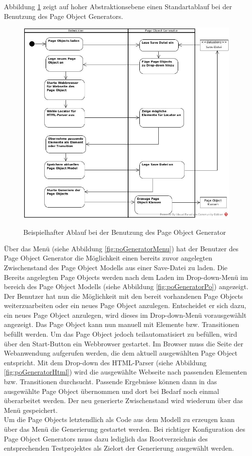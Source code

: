 Abbildung \ref{fig:sequenz} zeigt auf hoher Abstraktionsebene einen Standartablauf bei der Benutzung des Page Object Generators.



\begin{figure}[htb]
  \centering  
  \includegraphics[scale=0.45]{img/Activitydiagram.jpg}\\
  \caption{Beispielhafter Ablauf bei der Benutzung des Page Object Generator}
  \label{fig:sequenz}
\end{figure}

Über das Menü (siehe Abbildung \ref{fig:poGeneratorMenu}) hat der Benutzer des Page Object Generator die Möglichkeit einen bereits zuvor angelegten Zwischenstand des Page Object Modells aus einer Save-Datei zu laden. Die Bereits angelegten Page Objects werden nach dem Laden im Drop-down-Menü im bereich des Page Object Modells (siehe Abbildung \ref{fig:poGeneratorPo}) angezeigt. Der Benutzer hat nun die Möglichkeit mit den bereit vorhandenen Page Objects weiterzuarbeiten oder ein neues Page Object anzulegen. Entscheidet er sich dazu, ein neues Page Object anzulegen, wird dieses im Drop-down-Menü vorausgewählt angezeigt. Das Page Object kann nun manuell mit Elemente bzw. Transitionen befüllt werden. Um das Page Object jedoch teilautomatisiert zu befüllen, wird über den Start-Button ein Webbrowser gestartet. Im Browser muss die Seite der Webanwendung aufgerufen werden, die dem aktuell ausgewählten Page Object entspricht. Mit dem Drop-down des HTML-Parser (siehe Abbildung \ref{fig:poGeneratorHtml}) wird die ausgewählte Webseite nach passenden Elementen bzw. Transitionen durchsucht.
Passende Ergebnisse können dann in das ausgewählte Page Object übernommen und dort bei Bedarf noch einmal überarbeitet werden.
Der neu generierte Zwischenstand wird wiederum über das Menü gespeichert.\\
Um die Page Objects letztendlich als Code aus dem Modell zu erzeugen kann über das Menü die Generierung gestartet werden. Bei richtiger Konfiguration des Page Object Generators muss dazu lediglich das Rootverzeichnis des entsprechenden Testprojektes als Zielort der Generierung ausgewählt werden.


